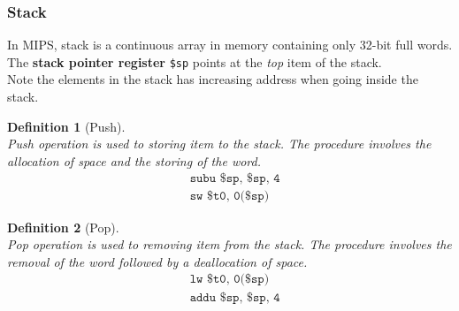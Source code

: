 \documentclass[12pt]{article}
\newtheorem{definition}{Definition}[section]
\theoremstyle{definition}
\begin{document}
\subsubsection{Stack}
In MIPS, stack is a continuous array in memory containing only 32-bit full words. The \textbf{stack pointer register} \texttt{\$sp} points at the \textit{top} item of the stack.\\
Note the elements in the stack has increasing address when going inside the stack. 
\begin{definition}[Push]
\hfill\\\normalfont Push operation is used to storing item to the stack. The procedure involves the allocation of space and the storing of the word.
\begin{align*}
&\texttt{subu \$sp, \$sp, 4}\\
&\texttt{sw \$t0, 0(\$sp)}
\end{align*}
\end{definition}
\begin{definition}[Pop]
\hfill\\\normalfont Pop operation is used to removing item from the stack. The procedure involves the removal of the word followed by a deallocation of space.
\begin{align*}
&\texttt{lw \$t0, 0(\$sp)}\\
&\texttt{addu \$sp, \$sp, 4}
\end{align*}
\end{definition}
\end{document}
